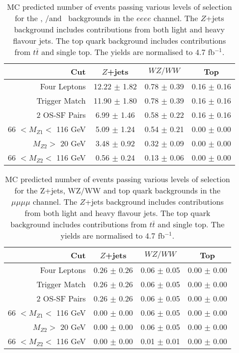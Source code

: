 \begin{table}[htbp]
  \centering
  \begin{tabular}{r|c|c|c} 
    \hline\hline
                 Cut &               $Z$+jets &             $WZ/WW$ &               Top\\ 
    \hline
        Four Leptons &  12.22 $\pm$ 1.82 & 0.78 $\pm$ 0.39 & 0.16 $\pm$ 0.16 \\ 
       Trigger Match &  11.90 $\pm$ 1.80 & 0.78 $\pm$ 0.39 & 0.16 $\pm$ 0.16 \\ 
       2 OS-SF Pairs &  6.99 $\pm$ 1.46 & 0.58 $\pm$ 0.22 & 0.16 $\pm$ 0.16 \\ 
66 $ < M_{Z1} < $ 116 GeV &  5.09 $\pm$ 1.24 & 0.54 $\pm$ 0.21 & 0.00 $\pm$ 0.00 \\ 
  $M_{Z2} > $ 20 GeV &  3.48 $\pm$ 0.92 & 0.32 $\pm$ 0.09 & 0.00 $\pm$ 0.00 \\ 
66 $ < M_{Z2} < $ 116 GeV &  0.56 $\pm$ 0.24 & 0.13 $\pm$ 0.06 & 0.00 $\pm$ 0.00 \\ 
    \hline\hline
  \end{tabular}
  \caption[MC predicted number of events passing various levels of selection for
  the \Zjets, \WZ/\WW and \topquark\ backgrounds in the $eeee$ channel.]
  {MC predicted number of events passing various levels of selection for
  the \Zjets, \WZ/\WW and \topquark\ backgrounds in the $eeee$ channel. The
  $Z$+jets background includes contributions from both light and heavy flavour
  jets. The top quark background includes contributions from $t\bar t$ and
  single top. The yields are normalised to 4.7 fb$^{-1}$.
}
  \label{table:mc-bg-4e}
\end{table}

\begin{table}[htbp]
  \centering
  \begin{tabular}{r|c|c|c} 
    \hline\hline
                 Cut &               $Z$+jets &             $WZ/WW$ &               Top\\ 
    \hline

        Four Leptons &  0.26 $\pm$ 0.26 & 0.06 $\pm$ 0.05 & 0.00 $\pm$ 0.00 \\ 
       Trigger Match &  0.26 $\pm$ 0.26 & 0.06 $\pm$ 0.05 & 0.00 $\pm$ 0.00 \\ 
       2 OS-SF Pairs &  0.26 $\pm$ 0.26 & 0.06 $\pm$ 0.05 & 0.00 $\pm$ 0.00 \\ 
66 $ < M_{Z1} < $ 116 GeV &  0.00 $\pm$ 0.00 & 0.06 $\pm$ 0.05 & 0.00 $\pm$ 0.00 \\ 
  $M_{Z2} > $ 20 GeV &  0.00 $\pm$ 0.00 & 0.06 $\pm$ 0.05 & 0.00 $\pm$ 0.00 \\ 
66 $ < M_{Z2} < $ 116 GeV &  0.00 $\pm$ 0.00 & 0.01 $\pm$ 0.01 & 0.00 $\pm$ 0.00 \\ 
    \hline\hline
  \end{tabular}
  \caption{MC predicted number of events passing various levels of selection for the Z+jets, WZ/WW and top quark backgrounds in the $\mu\mu\mu\mu$ channel. The $Z$+jets background includes contributions from both light and heavy flavour jets. The top quark background includes contributions from $t\bar t$ and single top. The yields are normalised to 4.7 fb$^{-1}$.
}
  \label{table:mc-bg-4mu}
\end{table}

